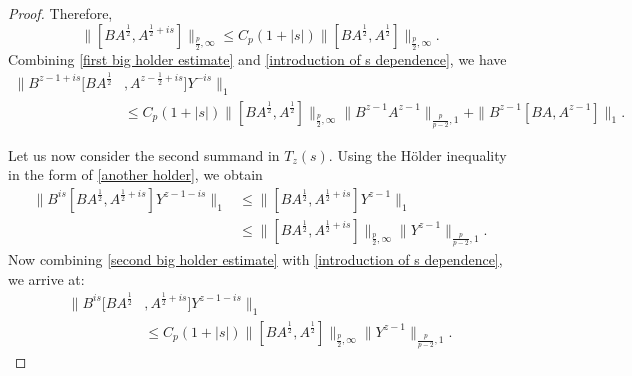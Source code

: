\begin{proof}
        Therefore,
        \begin{equation}\label{introduction of s dependence}
            \|[BA^{\frac12},A^{\frac12+is}]\|_{\frac{p}{2},\infty} \leq C_p(1+|s|)\|[BA^{\frac12},A^{\frac12}]\|_{\frac{p}{2},\infty}.
        \end{equation}
        Combining \eqref{first big holder estimate} and \eqref{introduction of s dependence}, we have
        \begin{align}
            \|B^{z-1+is}[BA^{\frac12}&,A^{z-\frac12+is}]Y^{-is}\|_1\nonumber\\
                                     &\leq C_p(1+|s|)\|[BA^{\frac12},A^{\frac12}]\|_{\frac{p}{2},\infty}\|B^{z-1}A^{z-1}\|_{\frac{p}{p-2},1}+\|B^{z-1}[BA,A^{z-1}]\|_1.\label{step 1 result}
        \end{align}

        Let us now consider the second summand in $T_z(s).$ Using the H\"older inequality in the form of \eqref{another holder}, we obtain
        \begin{align}
            \|B^{is}[BA^{\frac12},A^{\frac12+is}]Y^{z-1-is}\|_1&\leq\|[BA^{\frac12},A^{\frac12+is}]Y^{z-1}\|_1\nonumber\\
                                                               &\leq\|[BA^{\frac12},A^{\frac12+is}]\|_{\frac{p}{2},\infty}\|Y^{z-1}\|_{\frac{p}{p-2},1}.\label{second big holder estimate}
        \end{align}
        Now combining \eqref{second big holder estimate} with \eqref{introduction of s dependence}, we arrive at:
        \begin{align}
            \|B^{is}[BA^{\frac12}&,A^{\frac12+is}]Y^{z-1-is}\|_1 \nonumber\\
                                 &\leq C_p(1+|s|)\|[BA^{\frac12},A^{\frac12}]\|_{\frac{p}{2},\infty}\|Y^{z-1}\|_{\frac{p}{p-2},1}.\label{step 2 result}
        \end{align}


\end{proof}

